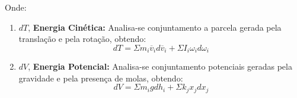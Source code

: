 \documentclass{article}
\begin{document}
            Onde:
                \begin{enumerate}[rightmargin = \leftmargin, noitemsep]
                    \item $dT$, \textbf{Energia Cinética:} Analisa-se conjuntamento a parcela gerada pela translação e pela rotação, obtendo:
                        \begin{equation}
                            \boxed{
                                dT = 
                                \Sigma m_{i}\overline{v}_{i}d\overline{v}_{i} +
                                \Sigma I_{i}\omega_{i}d\omega_{i}
                            }
                        \end{equation}

                    \item $dV$, \textbf{Energia Potencial:} Analisa-se conjuntamento potenciais geradas pela gravidade e pela presença de molas, obtendo:
                        \begin{equation}
                            \boxed{
                                dV = 
                                \Sigma m_{i} g d h_{i} +
                                \Sigma k_{j} x_{j} d x_{j}
                            }
                        \end{equation}
                \end{enumerate}
\end{document}
